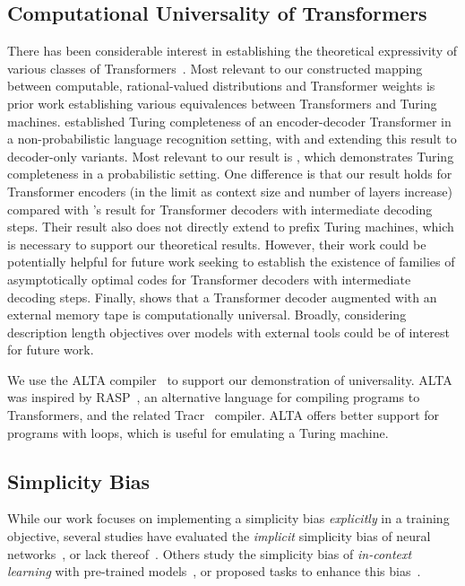 \subsection{Computational Universality of Transformers}
\label{sec:zmap-related-work}

There has been considerable interest in establishing the theoretical expressivity of various classes of Transformers~\citep{perez2021attention,chiang2023tighter,yun2020are,feng2023towards,merrill2024expressive,nowak2024representational,merrill2024little}. Most relevant to our constructed mapping between computable, rational-valued distributions and Transformer weights is prior work establishing various equivalences between Transformers and Turing machines. \citet{perez2021attention} established Turing completeness of an encoder-decoder Transformer in a non-probabilistic language recognition setting, with \citet{merrill2024expressive} and \citet{feng2023towards} extending this result to decoder-only variants. Most relevant to our result is \citet{nowak2024representational}, which demonstrates Turing completeness in a probabilistic setting. One difference is that our result holds for Transformer encoders (in the limit as context size and number of layers increase) compared with \citet{nowak2024representational}'s result for Transformer decoders with intermediate decoding steps. Their result also does not directly extend to prefix Turing machines, which is necessary to support our theoretical results. However, their work could be potentially helpful for future work seeking to establish the existence of families of asymptotically optimal codes for Transformer decoders with intermediate decoding steps.
Finally, \citet{schuurmans2023memory} shows that a Transformer decoder augmented with an external memory tape is computationally universal. Broadly, considering description length objectives over models with external tools could be of interest for future work. 

We use the ALTA compiler~\citep{shaw2024alta} to support our demonstration of universality. ALTA was inspired by RASP~\citep{weiss2021thinking}, an alternative language for compiling programs to Transformers, and the related Tracr~\citep{lindner2024tracr} compiler. ALTA offers better support for programs with loops, which is useful for emulating a Turing machine.

\subsection{Simplicity Bias} While our work focuses on implementing a simplicity bias \emph{explicitly} in a training objective, several studies have evaluated the \emph{implicit} simplicity bias of neural networks~\citep{zhou2023algorithms,abbe2023generalization,bhattamishra2023simplicity,tsoy2024simplicity,chen2024sudden,mingard2025deep}, or lack thereof~\cite[e.g.,][]{nikankin2025arithmetic}. Others study the simplicity bias of \emph{in-context learning} with pre-trained models~\citep{goldblum2023no,deletang2024language}, or proposed tasks to enhance this bias~\citep{grau-moya2024learning}.
